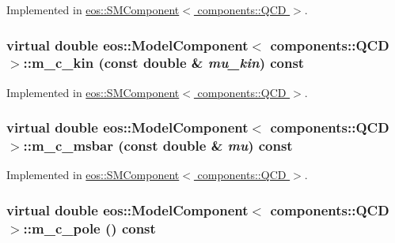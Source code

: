 Implemented in \hyperlink{classeos_1_1SMComponent_3_01components_1_1QCD_01_4_a2f052ffa95426e07ab019fa275ce41d9}{eos::SMComponent$<$ components::QCD $>$}.\hypertarget{classeos_1_1ModelComponent_3_01components_1_1QCD_01_4_a0cd270cd7c6528f41a34cfc1e70bf056}{
\subsubsection[{m\_\-c\_\-kin}]{\setlength{\rightskip}{0pt plus 5cm}virtual double eos::ModelComponent$<$ components::QCD $>$::m\_\-c\_\-kin (const double \& {\em mu\_\-kin}) const}}
\label{classeos_1_1ModelComponent_3_01components_1_1QCD_01_4_a0cd270cd7c6528f41a34cfc1e70bf056}


Implemented in \hyperlink{classeos_1_1SMComponent_3_01components_1_1QCD_01_4_a346c272825a490a9f5884af8b8ceebfe}{eos::SMComponent$<$ components::QCD $>$}.\hypertarget{classeos_1_1ModelComponent_3_01components_1_1QCD_01_4_a82e6a460fe4fb848928fe6952fd56bb1}{
\subsubsection[{m\_\-c\_\-msbar}]{\setlength{\rightskip}{0pt plus 5cm}virtual double eos::ModelComponent$<$ components::QCD $>$::m\_\-c\_\-msbar (const double \& {\em mu}) const}}
\label{classeos_1_1ModelComponent_3_01components_1_1QCD_01_4_a82e6a460fe4fb848928fe6952fd56bb1}


Implemented in \hyperlink{classeos_1_1SMComponent_3_01components_1_1QCD_01_4_af1f05d988210a50359490a150d9170e0}{eos::SMComponent$<$ components::QCD $>$}.\hypertarget{classeos_1_1ModelComponent_3_01components_1_1QCD_01_4_a3a2c090cf0f7099c471fd4cc413431e3}{
\subsubsection[{m\_\-c\_\-pole}]{\setlength{\rightskip}{0pt plus 5cm}virtual double eos::ModelComponent$<$ components::QCD $>$::m\_\-c\_\-pole () const}}
\label{classeos_1_1ModelComponent_3_01components_1_1QCD_01_4_a3a2c090cf0f7099c471fd4cc413431e3}


